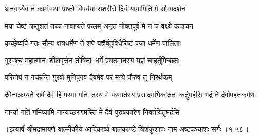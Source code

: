 \twolineshloka
{अनवाप्यैव तं कामं मया प्राप्तो विपर्ययः}
{सशरीरो दिवं यायामिति मे सौम्यदर्शन} %

\twolineshloka
{मया चेष्टं क्रतुशतं तच्च नावाप्यते फलम्}
{अनृतं नोक्तपूर्वं मे न च वक्ष्ये कदाचन} %

\twolineshloka
{कृच्छ्रेष्वपि गतः सौम्य क्षत्रधर्मेण ते शपे}
{यज्ञैर्बहुविधैरिष्टं प्रजा धर्मेण पालिताः} %

\twolineshloka
{गुरवश्च महात्मानः शीलवृत्तेन तोषिताः}
{धर्मे प्रयतमानस्य यज्ञं चाहर्तुमिच्छतः} %

\twolineshloka
{परितोषं न गच्छन्ति गुरवो मुनिपुंगव}
{दैवमेव परं मन्ये पौरुषं तु निरर्थकम्} %

\threelineshloka
{दैवेनाक्रम्यते सर्वं दैवं हि परमा गतिः}
{तस्य मे परमार्तस्य प्रसादमभिकांक्षतः}
{कर्तुमर्हसि भद्रं ते दैवोपहतकर्मणः} %

\twolineshloka
{नान्यां गतिं गमिष्यामि नान्यच्छरणमस्ति मे}
{दैवं पुरुषकारेण निवर्तयितुमर्हसि} %


॥इत्यार्षे श्रीमद्रामायणे वाल्मीकीये आदिकाव्ये बालकाण्डे त्रिशंकुशापः नाम अष्टपञ्चाशः सर्गः ॥१-५८॥
